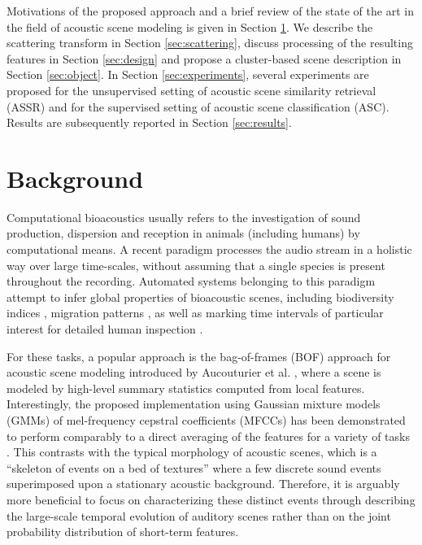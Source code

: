 \documentclass[journal]{IEEEtran}
\makeatletter
\newcommand*{\ie}{i.e.\@\xspace}
\makeatother
\begin{document}
Motivations of the proposed approach and a brief review of the state of the art in the field of acoustic scene modeling is given in Section \ref{sec:soa}. We describe the scattering transform in Section \ref{sec:scattering}, discuss processing of the resulting features in Section \ref{sec:design} and propose a cluster-based scene description in Section \ref{sec:object}. In Section \ref{sec:experiments}, several experiments are proposed for the unsupervised setting of acoustic scene similarity retrieval (ASSR) and for the supervised setting of acoustic scene classification (ASC). Results are subsequently reported in Section \ref{sec:results}.

\section{Background} \label{sec:soa}


Computational bioacoustics usually refers to the investigation of sound production, dispersion and reception in animals (including humans) by computational means. A recent paradigm  processes the audio stream in a holistic way over large time-scales, without assuming that a single species is present throughout the recording. Automated systems belonging to this paradigm attempt to infer global properties of bioacoustic scenes, including biodiversity indices \cite{Bardeli2010}, migration patterns \cite{Obrist2010}, as well as marking time intervals of particular interest for detailed human inspection \cite{rosenstock2002landbird}.

For these tasks, a popular approach is the bag-of-frames (BOF) approach for acoustic scene modeling introduced by Aucouturier et al. \cite{aucouturier2007bag}, where a scene is modeled by high-level summary statistics computed from local features.
Interestingly, the proposed implementation using Gaussian mixture models (GMMs) of mel-frequency cepstral coefficients (MFCCs) has been demonstrated to perform comparably to a direct averaging of the features for a variety of tasks \cite{lagrange:hal-01082501}.
This contrasts with the typical morphology of acoustic scenes, which is a ``skeleton of events on a bed of textures'' \cite{nelken2013} where a few discrete sound events superimposed upon a stationary acoustic background.
Therefore, it is arguably more beneficial to focus on characterizing these distinct events through describing the large-scale temporal evolution of auditory scenes rather than on the joint probability distribution of short-term features.
\end{document}
